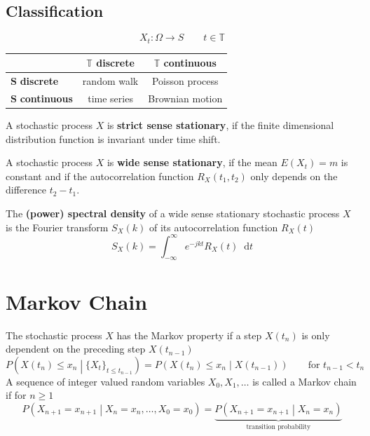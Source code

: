 \documentclass[11pt]{article}
\theoremstyle{definition}
\newcommand*\diff{\mathop{}\!\mathrm{d}}
\begin{document}
\pagebreak
\subsection{Classification}
\begin{equation*}
	X_t : \Omega \rightarrow S\qquad t\in\mathbb{T}
\end{equation*}
\begin{tabularx}{\linewidth}{|X||c|c|}
	\hline
	& $\bm{\mathbb{T}}$ \textbf{discrete} & $\bm{\mathbb{T}}$ \textbf{continuous}\\
	\hline
	\hline
	$\bm{S}$ \textbf{discrete} & random walk & Poisson process\\
	\hline
	$\bm{S}$ \textbf{continuous} & time series & Brownian motion\\
	\hline
\end{tabularx}

\begin{definition}
	A stochastic process $X$ is \textbf{strict sense stationary}, if the finite dimensional distribution function is invariant under time shift.
\end{definition}

\begin{definition}
	A stochastic process $X$ is \textbf{wide sense stationary}, if the mean $E(X_t) = m$ is constant and if the autocorrelation function $R_X(t_1,t_2)$ only depends on the difference $t_2-t_1$.
\end{definition}

\begin{definition}
	The \textbf{(power) spectral density} of a wide sense stationary stochastic process $X$ is the Fourier transform $S_X(k)$ of its autocorrelation function $R_X(t)$
	\begin{equation*}
		S_X(k) = \int_{-\infty}^{\infty}e^{-jkt} R_X(t)\diff{t}
	\end{equation*}
\end{definition}

\section{Markov Chain}
The stochastic process $X$ has the Markov property if a step $X(t_n)$ is only dependent on the preceding step $X(t_{n-1})$
\begin{equation*}
	P\left(X(t_n)\leq x_n \middle| \{X_t\}_{t\leq t_{n-1}} \right) = P\left(X(t_n)\leq x_n \middle| X(t_{n-1}) \right)\qquad\text{for }t_{n-1}<t_n
\end{equation*}
A sequence of integer valued random variables $X_0, X_1,\dots$ is called a Markov chain if for $n \geq 1$
\begin{equation*}
	P\left( X_{n+1}=x_{n+1} \middle| X_{n}=x_{n},\dots,X_{0}=x_{0} \right) = \underbrace{P\left( X_{n+1}=x_{n+1} \middle| X_{n}=x_{n} \right)}_{\text{transition probability}}
\end{equation*}
\end{document}
